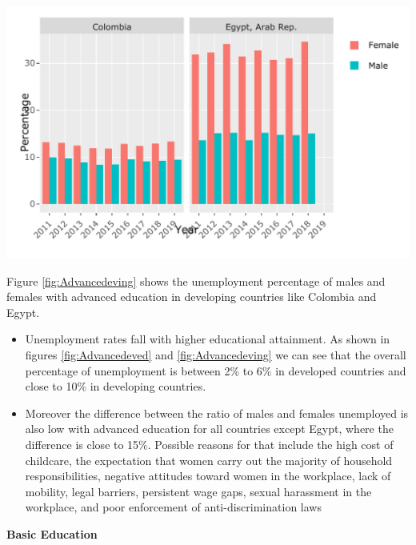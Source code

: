 \documentclass[11pt,a4paper,]{article}
\let\origfigure\figure
\let\endorigfigure\endfigure
\renewenvironment{figure}[1][2] {
    \expandafter\origfigure\expandafter[H]
} {
    \endorigfigure
}
\begin{document}
\begin{figure}
\centering
\includegraphics{The_Outsiders_5513_files/figure-latex/Advancedeving-1.pdf}
\caption{\label{fig:Advancedeving}Unemployment with advanced education in developing countries}
\end{figure}

Figure \ref{fig:Advancedeving} shows the unemployment percentage of males and females with advanced education in developing countries like Colombia and Egypt.

\begin{itemize}
\item
  Unemployment rates fall with higher educational attainment. As shown in figures \ref{fig:Advancedeved} and \ref{fig:Advancedeving} we can see that the overall percentage of unemployment is between 2\% to 6\% in developed countries and close to 10\% in developing countries.
\item
  Moreover the difference between the ratio of males and females unemployed is also low with advanced education for all countries except Egypt, where the difference is close to 15\%. Possible reasons for that include the high cost of childcare, the expectation that women carry out the majority of household responsibilities, negative attitudes toward women in the workplace, lack of mobility, legal barriers, persistent wage gaps, sexual harassment in the workplace, and poor enforcement of anti-discrimination laws \autocite{barriersegypt}
\end{itemize}

\clearpage

\textbf{Basic Education}
\end{document}
